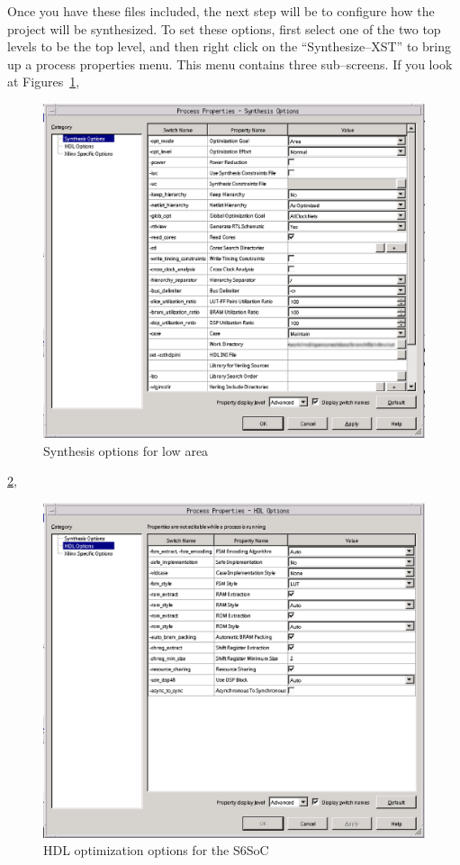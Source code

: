 \documentclass{gqtekspec}
\begin{document}
Once you have these files included, the next step will be to configure how the
project will be synthesized.  To set these options, first select one of the
two top levels to be the top level, and then right click on the
``Synthesize--XST'' to bring up a process properties menu.  This menu contains
three sub--screens.  If you look at
Figures~\ref{fig:xstopts},
\begin{figure}
\begin{center}
\includegraphics[width=6in]{../gfx/xstopts.eps}
\caption{Synthesis options for low area}\label{fig:xstopts}
\end{center}\end{figure}
%
\ref{fig:hdlopts},
%
\begin{figure}
\begin{center}
\includegraphics[width=6in]{../gfx/hdlopts.eps}
\caption{HDL optimization options for the S6SoC}\label{fig:hdlopts}
\end{center}\end{figure}
\end{document}
